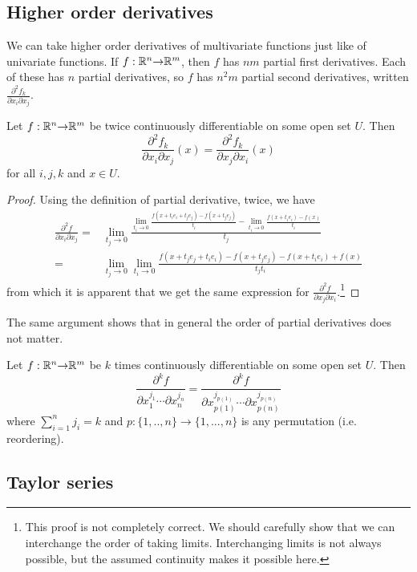 \subsection{Higher order derivatives}
We can take higher order derivatives of multivariate functions just
like of univariate functions. If $f: \mathbb{R}^n {\rightarrow} \mathbb{R}^m$, then $f$ has $nm$
partial first derivatives. Each of these has $n$ partial derivatives,
so $f$ has $n^2m$ partial second derivatives, written
$\frac{\partial^2 f_k}{\partial x_i \partial x_j}$. 
\begin{theorem}
  Let $f: \mathbb{R}^n {\rightarrow} \mathbb{R}^m$ be twice continuously differentiable on some
  open set $U$. Then
  \[ \frac{\partial^2 f_k}{\partial x_i \partial
    x_j}(x) =  \frac{\partial^2 f_k}{\partial x_j \partial
    x_i} (x) \]
  for all $i,j,k$ and $ x \in U$.
\end{theorem}
\begin{proof}
  Using the definition of partial derivative, twice, we have
  \begin{align*}
    \frac{\partial^2 f}{\partial x_i \partial x_j} = & \lim_{t_j \to 0}
    \frac{ \lim_{t_i \to 0} \frac{ f(x + t_i e_i + t_j e_j) - f(x +
        t_j e_j)}{t_i} - \lim_{t_i \to 0} \frac{ f(x + t_i e_i) -
        f(x)}{t_i} }{t_j} \\
    = & \lim_{t_j \to 0} \lim_{t_i \to 0} \frac{f(x+t_je_j + t_i e_i)
      - f(x + t_j e_j) - f(x + t_i e_i) + f(x)} {t_j t_i}
  \end{align*}
  from which it is apparent that we get the same expression for $
  \frac{\partial^2 f}{\partial x_j \partial x_i} $.\footnote{This
    proof is not completely correct. We should carefully show that we
    can interchange the order of taking limits. Interchanging limits
    is not always possible, but the assumed continuity makes it
    possible here.}
\end{proof}
The same argument shows that in general the order of partial
derivatives does not matter.
\begin{corollary}
  Let $f: \mathbb{R}^n {\rightarrow} \mathbb{R}^m$ be $k$ times continuously differentiable on
  some open set $U$. Then 
  \[ \frac{\partial^k f}{\partial x_1^{j_1} \cdots
     \partial x_n^{j_n}} = 
  \frac{\partial^k f}{\partial x_{p(1)}^{j_{p(1)}}  \cdots \partial
    x_{p(n)}^{j_{p(n)}}} \]
  where $\sum_{i=1}^n j_i = k$ and $p:\{1,..,n\} \to \{1,...,n\}$ is
  any permutation (i.e. reordering).
\end{corollary}

\subsection{Taylor series}

